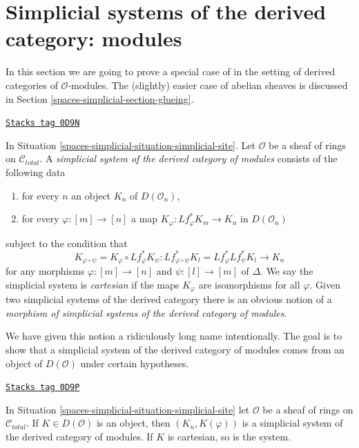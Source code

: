 \section{Simplicial systems of the derived category: modules}
\label{spaces-simplicial-section-glueing-modules}
In this section we are going to prove a special case of
\cite[Proposition 3.2.9]{BBD} in the setting of derived
categories of $\mathcal{O}$-modules. The (slightly) easier
case of abelian sheaves is discussed in Section \ref{spaces-simplicial-section-glueing}.

\begin{definition}
\label{spaces-simplicial-definition-cartesian-derived-modules}
\href{https://stacks.math.columbia.edu/tag/0D9N}{\texttt{Stacks tag 0D9N}}

In Situation \ref{spaces-simplicial-situation-simplicial-site}. Let $\mathcal{O}$
be a sheaf of rings on $\mathcal{C}_{total}$. A
{\it simplicial system of the derived category of modules}
consists of the following data
\begin{enumerate}
\item for every $n$ an object $K_n$ of $D(\mathcal{O}_n)$,
\item for every $\varphi : [m] \to [n]$ a map
$K_\varphi : Lf_\varphi^*K_m \to K_n$ in $D(\mathcal{O}_n)$
\end{enumerate}
subject to the condition that
$$
K_{\varphi \circ \psi} = K_\varphi \circ Lf_\varphi^*K_\psi :
Lf_{\varphi \circ \psi}^*K_l = Lf_\varphi^* Lf_\psi^*K_l
\longrightarrow
K_n
$$
for any morphisms $\varphi : [m] \to [n]$ and $\psi : [l] \to [m]$ of $\Delta$.
We say the simplicial system is {\it cartesian} if the maps $K_\varphi$
are isomorphisms for all $\varphi$.
Given two simplicial systems of the derived category
there is an obvious notion of a
{\it morphism of simplicial systems of the derived category of modules}.
\end{definition}

We have given this notion a ridiculously long name intentionally.
The goal is to show that a simplicial system of the derived category
of modules comes from an object of $D(\mathcal{O})$ under certain
hypotheses.

\begin{lemma}
\label{spaces-simplicial-lemma-cartesian-objects-derived-modules}
\href{https://stacks.math.columbia.edu/tag/0D9P}{\texttt{Stacks tag 0D9P}}

In Situation \ref{spaces-simplicial-situation-simplicial-site} let $\mathcal{O}$ be a
sheaf of rings on $\mathcal{C}_{total}$.
If $K \in D(\mathcal{O})$ is an object, then $(K_n, K(\varphi))$
is a simplicial system of the derived category of modules.
If $K$ is cartesian, so is the system.
\end{lemma}

